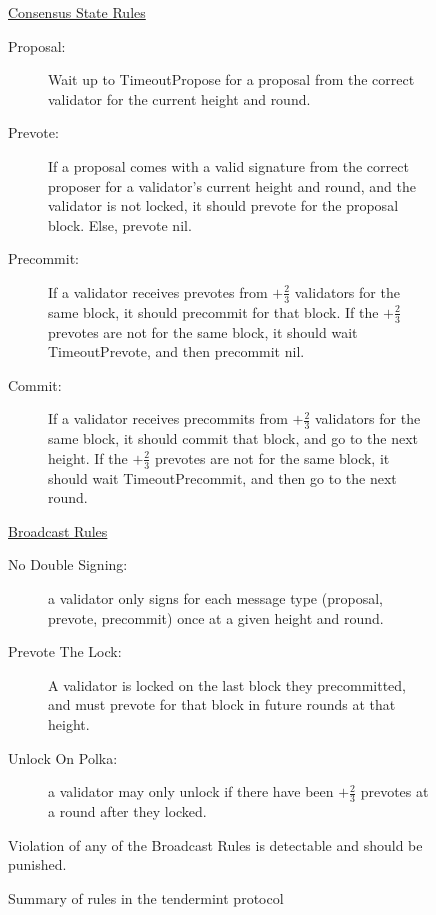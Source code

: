 \begin{figure}[]
	\underline{Consensus State Rules}
		\begin{description}
			\item[Proposal:] Wait up to TimeoutPropose for a proposal from the correct validator for the current height and round.
			\item[Prevote:]  If a proposal comes with a valid signature from the correct proposer for a validator’s current height and round, and the validator is not locked, it should prevote for the proposal block. Else, prevote nil.
			\item[Precommit:] If a validator receives prevotes from $+\frac{2}{3}$ validators for the same block, it should precommit for that block. If the $+\frac{2}{3}$ prevotes are not for the same block, it should wait TimeoutPrevote, and then precommit nil.
			\item[Commit:] If a validator receives precommits from $+\frac{2}{3}$ validators for the same block, it should commit that block, and go to the next height.  If the $+\frac{2}{3}$ prevotes are not for the same block, it should wait TimeoutPrecommit, and then go to the next round.
		\end{description}

	\underline{Broadcast Rules}
		\begin{description}
			\item[No Double Signing:] a validator only signs for each message type (proposal, prevote, precommit) once at a given height and round.
			\item[Prevote The Lock:] A validator is locked on the last block they precommitted, and must prevote for that block in future rounds at that height.
			\item[Unlock On Polka:] a validator may only unlock if there have been $+\frac{2}{3}$ prevotes at a round after they locked. 
		\end{description}
		Violation of any of the Broadcast Rules is detectable and should be punished.

	\caption[Summary of tendermint protocol rules]{Summary of rules in the tendermint protocol}
	\label{fig:tendermint_summary}
\end{figure}




